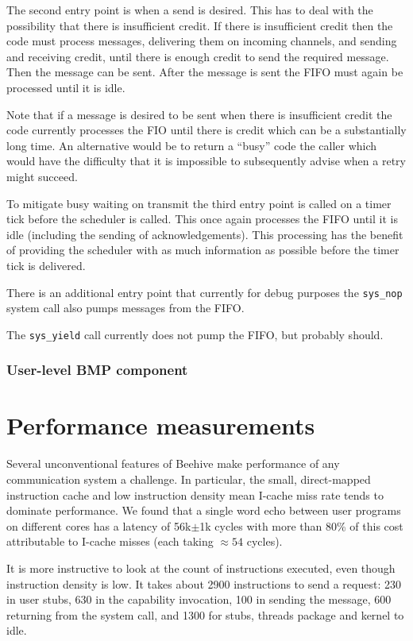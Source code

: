 \documentclass[a4paper,twoside]{report} %
\begin{document}
The second entry point is when a send is desired.  This has to deal
with the possibility that there is insufficient credit.  If there is
insufficient credit then the code must process messages, delivering
them on incoming channels, and sending and receiving credit, until
there is enough credit to send the required message.  Then the message
can be sent.  After the message is sent the FIFO must again be
processed until it is idle.

Note that if a message is desired to be sent when there is
insufficient credit the code currently processes the FIO until there
is credit which can be a substantially long time.  An alternative
would be to return a ``busy'' code the caller which would have the
difficulty that it is impossible to subsequently advise when a retry
might succeed.

To mitigate busy waiting on transmit the third entry point is called
on a timer tick before the scheduler is called.  This once again
processes the FIFO until it is idle (including the sending of
acknowledgements).  This processing has the benefit of providing the
scheduler with as much information as possible before the timer tick
is delivered.

There is an additional entry point that currently for debug purposes
the \texttt{sys\_nop} system call also pumps messages from the FIFO.

The \texttt{sys\_yield} call currently does not pump the FIFO, but
probably should.

\subsection{User-level BMP component}

\chapter{Performance measurements}

Several unconventional features of Beehive make performance of any
communication system a challenge.  In particular, the small,
direct-mapped instruction cache and low instruction density mean 
I-cache miss rate tends to dominate performance.
We found that a single word echo between user programs on
different cores has a latency of 56k$\pm$1k cycles with more than 80\%
of this cost attributable to I-cache misses (each taking
$\approx54$ cycles).

It is more instructive to look at the count of instructions executed,
even though instruction density is low.  It takes about 2900
instructions to send a request: 230 in user stubs,
630 in the capability invocation, 100 in sending the message, 600
returning from the system call, and 1300 for stubs, threads package
and kernel to idle. 
\end{document}
